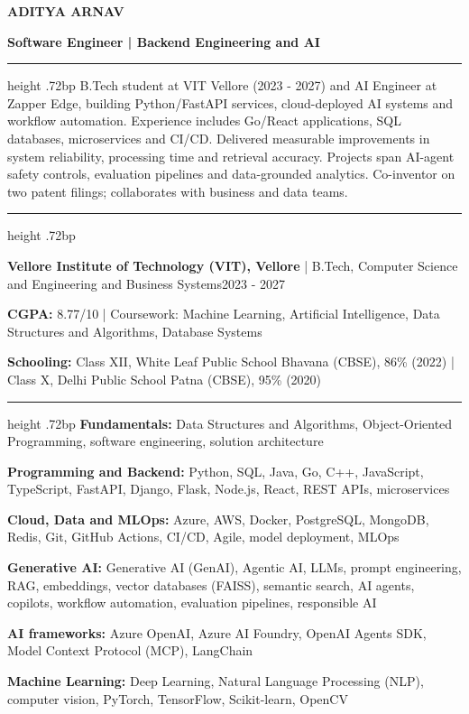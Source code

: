 \documentclass[10pt]{article}
\newcommand{\resumesection}[1]{\par\vspace{5.4bp}{\fontsize{10.56bp}{12.5bp}\selectfont\bfseries #1\par}\vspace{1bp}\hrule height .72bp\vspace{3.2bp}}
\newcommand{\entry}[2]{\par #1\hfill #2\par}
\begin{document}
\fontsize{9.48bp}{11.6bp}\selectfont
{\centering
{\fontsize{18bp}{21bp}\selectfont\bfseries ADITYA ARNAV\par}
\vspace{1bp}
{\fontsize{10.56bp}{12.6bp}\selectfont\bfseries Software Engineer | Backend Engineering and AI\par}
\vspace{.3bp}
{\fontsize{9bp}{11bp}\selectfont{}\par}}

\resumesection{SUMMARY}
B.Tech student at VIT Vellore (2023 - 2027) and AI Engineer at Zapper Edge, building Python/FastAPI services, cloud-deployed AI systems and workflow automation. Experience includes Go/React applications, SQL databases, microservices and CI/CD. Delivered measurable improvements in system reliability, processing time and retrieval accuracy. Projects span AI-agent safety controls, evaluation pipelines and data-grounded analytics. Co-inventor on two patent filings; collaborates with business and data teams.

\resumesection{EDUCATION}
\entry{\textbf{Vellore Institute of Technology (VIT), Vellore} | B.Tech, Computer Science and Engineering and Business Systems}{2023 - 2027}
\textbf{CGPA:} 8.77/10 | Coursework: Machine Learning, Artificial Intelligence, Data Structures and Algorithms, Database Systems\par
\vspace{.6bp}
\textbf{Schooling:} Class XII, White Leaf Public School Bhavana (CBSE), 86\% (2022) | Class X, Delhi Public School Patna (CBSE), 95\% (2020)

\resumesection{TECHNICAL SKILLS}
\textbf{Fundamentals:} Data Structures and Algorithms, Object-Oriented Programming, software engineering, solution architecture\par
\vspace{.6bp}
\textbf{Programming and Backend:} Python, SQL, Java, Go, C++, JavaScript, TypeScript, FastAPI, Django, Flask, Node.js, React, REST APIs, microservices\par
\vspace{.6bp}
\textbf{Cloud, Data and MLOps:} Azure, AWS, Docker, PostgreSQL, MongoDB, Redis, Git, GitHub Actions, CI/CD, Agile, model deployment, MLOps\par
\vspace{.6bp}
\textbf{Generative AI:} Generative AI (GenAI), Agentic AI, LLMs, prompt engineering, RAG, embeddings, vector databases (FAISS), semantic search, AI agents, copilots, workflow automation, evaluation pipelines, responsible AI\par
\vspace{.6bp}
\textbf{AI frameworks:} Azure OpenAI, Azure AI Foundry, OpenAI Agents SDK, Model Context Protocol (MCP), LangChain\par
\vspace{.6bp}
\textbf{Machine Learning:} Deep Learning, Natural Language Processing (NLP), computer vision, PyTorch, TensorFlow, Scikit-learn, OpenCV
\end{document}
